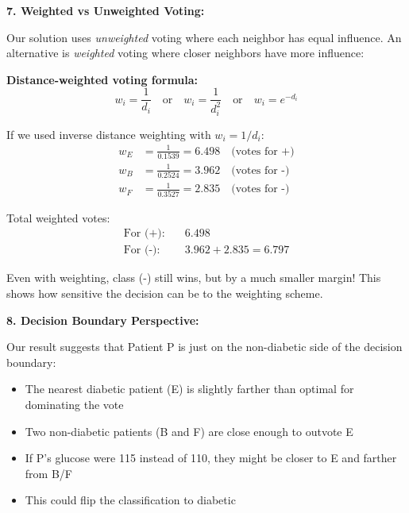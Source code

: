 \documentclass[12pt]{article}
\begin{document}
\begin{explanation}
\textbf{7. Weighted vs Unweighted Voting:}

Our solution uses \textit{unweighted} voting where each neighbor has equal influence. An alternative is \textit{weighted} voting where closer neighbors have more influence:

\textbf{Distance-weighted voting formula:}
\[
w_i = \frac{1}{d_i} \quad \text{or} \quad w_i = \frac{1}{d_i^2} \quad \text{or} \quad w_i = e^{-d_i}
\]

If we used inverse distance weighting with \(w_i = 1/d_i\):
\begin{align*}
w_E &= \frac{1}{0.1539} = 6.498 \quad \text{(votes for +)} \\
w_B &= \frac{1}{0.2524} = 3.962 \quad \text{(votes for -)} \\
w_F &= \frac{1}{0.3527} = 2.835 \quad \text{(votes for -)}
\end{align*}

Total weighted votes:
\begin{align*}
\text{For (+):} \quad &6.498 \\
\text{For (-):} \quad &3.962 + 2.835 = 6.797
\end{align*}

Even with weighting, class (-) still wins, but by a much smaller margin! This shows how sensitive the decision can be to the weighting scheme.

\textbf{8. Decision Boundary Perspective:}

Our result suggests that Patient P is just on the non-diabetic side of the decision boundary:
\begin{itemize}
    \item The nearest diabetic patient (E) is slightly farther than optimal for dominating the vote
    \item Two non-diabetic patients (B and F) are close enough to outvote E
    \item If P's glucose were 115 instead of 110, they might be closer to E and farther from B/F
    \item This could flip the classification to diabetic
\end{itemize}
\end{explanation}
\end{document}
